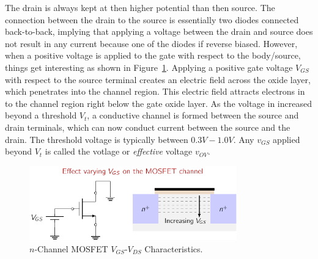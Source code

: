 The drain is always kept at then higher potential than then source. The connection between the drain to the source is essentially two diodes connected back-to-back, implying that applying a voltage between the drain and source does not result in any current because one of the diodes if reverse biased. However, when a positive voltage is applied to the gate with respect to the body/source, things get interesting as shown in Figure~\ref{fig:03-mosfet-gate-volt}. Applying a positive gate voltage $V_{GS}$ with respect to the source terminal creates an electric field across the oxide layer, which penetrates into the channel region. This electric field attracts electrons in to the channel region right below the gate oxide layer. As the voltage in increased beyond a threshold $V_t$, a conductive channel is formed between the source and drain terminals, which can now conduct current between the source and the drain. The threshold voltage is typically between $0.3V-1.0V$. Any $v_{GS}$ applied beyond $V_t$ is called the  votlage or \textit{effective} voltage $v_{OV}$.

\begin{figure}[t]
    \centering
    \includegraphics[width=0.8\textwidth]{figure/ch03/fig03-mosfet-vgs-vds.pdf}
    \caption{$n$-Channel MOSFET $V_{GS}$-$V_{DS}$ Characteristics.}
    \label{fig:03-mosfet-gate-volt}
\end{figure}

